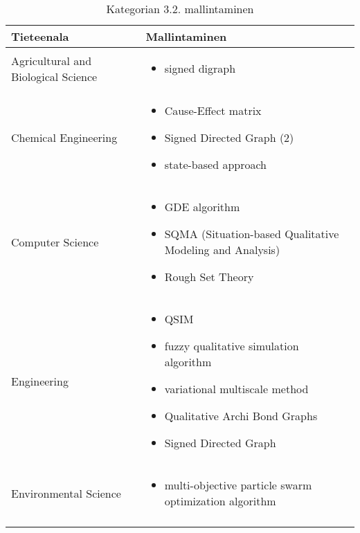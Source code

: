 \documentclass[utf8]{gradu3}
\begin{document}
\begin{longtable}[h]{|p{5cm}|p{8cm}|}
    \hline
    \textbf{Tieteenala}    &    \textbf{Mallintaminen}\\
    \hline
    Agricultural and Biological Science & \begin{itemize}
        \item signed digraph
    \end{itemize} \\
    \hline
    Chemical Engineering & \begin{itemize}
        \item Cause-Effect matrix
        \item Signed Directed Graph (2)
        \item state-based approach
    \end{itemize} \\
    \hline
    Computer Science & \begin{itemize}
        \item GDE algorithm
        \item SQMA (Situation-based Qualitative Modeling and Analysis)
        \item Rough Set Theory
    \end{itemize} \\
    \hline
    Engineering & \begin{itemize}
        \item QSIM
        \item fuzzy qualitative simulation algorithm
        \item variational multiscale method
        \item Qualitative Archi Bond Graphs
        \item Signed Directed Graph
    \end{itemize} \\
    \hline
    Environmental Science & \begin{itemize}
        \item multi-objective particle swarm optimization algorithm
    \end{itemize} \\
    \hline
    \caption{Kategorian 3.2. mallintaminen}
    \label{table:Kategorian 3.2. mallintaminen}
\end{longtable}
\end{document}
